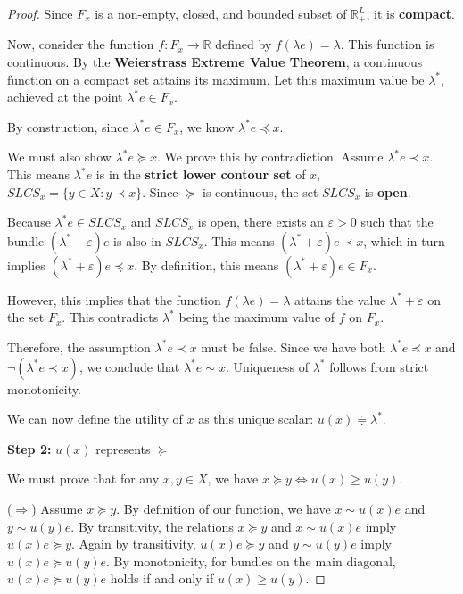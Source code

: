 \begin{proof}
    Since $F_x$ is a non-empty, closed, and bounded subset of $\mathbb{R}^L_+$, it is \textbf{compact}.

    Now, consider the function $f: F_x \to \mathbb{R}$ defined by $f(\lambda e) = \lambda$. This function is continuous. By the \textbf{Weierstrass Extreme Value Theorem}, a continuous function on a compact set attains its maximum. Let this maximum value be $\lambda^*$, achieved at the point $\lambda^* e \in F_x$.

    By construction, since $\lambda^* e \in F_x$, we know $\lambda^* e \preceq x$.

    We must also show $\lambda^* e \succeq x$. We prove this by contradiction. Assume $\lambda^* e \prec x$. This means $\lambda^* e$ is in the \textbf{strict lower contour set} of $x$, $SLCS_x = \{y \in X : y \prec x\}$. Since $\succeq$ is continuous, the set $SLCS_x$ is \textbf{open}.

    Because $\lambda^* e \in SLCS_x$ and $SLCS_x$ is open, there exists an $\varepsilon > 0$ such that the bundle $(\lambda^* + \varepsilon)e$ is also in $SLCS_x$. This means $(\lambda^* + \varepsilon)e \prec x$, which in turn implies $(\lambda^* + \varepsilon)e \preceq x$. By definition, this means $(\lambda^* + \varepsilon)e \in F_x$.

    However, this implies that the function $f(\lambda e) = \lambda$ attains the value $\lambda^* + \varepsilon$ on the set $F_x$. This contradicts $\lambda^*$ being the maximum value of $f$ on $F_x$.

    Therefore, the assumption $\lambda^* e \prec x$ must be false. Since we have both $\lambda^* e \preceq x$ and $\neg(\lambda^* e \prec x)$, we conclude that $\lambda^* e \sim x$. Uniqueness of $\lambda^*$ follows from strict monotonicity.

    We can now define the utility of $x$ as this unique scalar: $u(x) \doteqdot \lambda^*$.

    \textbf{Step 2:} $u(x)$ represents $\succeq$

    We must prove that for any $x, y \in X$, we have $x \succeq y \iff u(x) \geq u(y)$.

    ($\Longrightarrow$) Assume $x \succeq y$. By definition of our function, we have $x \sim u(x)e$ and $y \sim u(y)e$.
    By transitivity, the relations $x \succeq y$ and $x \sim u(x)e$ imply $u(x)e \succeq y$.
    Again by transitivity, $u(x)e \succeq y$ and $y \sim u(y)e$ imply $u(x)e \succeq u(y)e$.
    By monotonicity, for bundles on the main diagonal, $u(x)e \succeq u(y)e$ holds if and only if $u(x) \geq u(y)$.


\end{proof}
